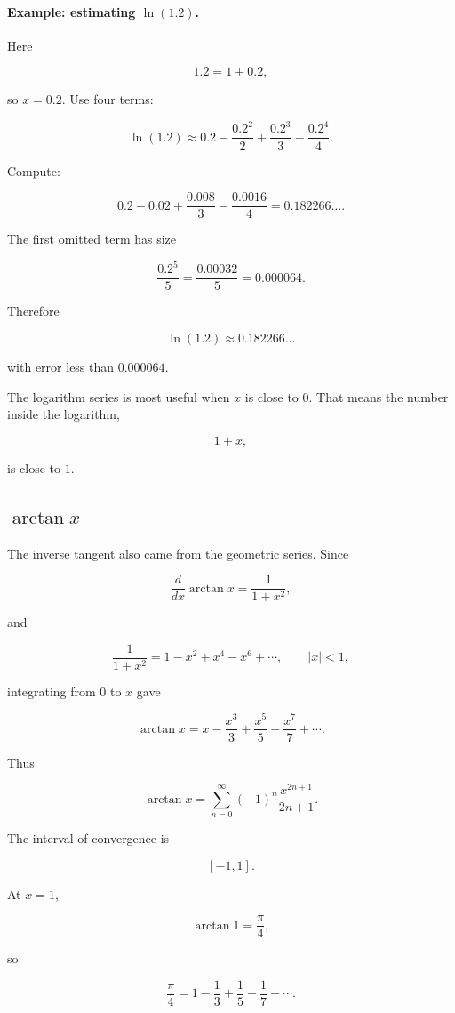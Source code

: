 \paragraph{Example: estimating \(\ln(1.2)\).}
Here

\[
1.2=1+0.2,
\]

so \(x=0.2\).  Use four terms:

\[
\ln(1.2)
\approx
0.2-\frac{0.2^2}{2}+\frac{0.2^3}{3}-\frac{0.2^4}{4}.
\]

Compute:

\[
0.2-0.02+\frac{0.008}{3}-\frac{0.0016}{4}
=
0.182266\ldots.
\]

The first omitted term has size

\[
\frac{0.2^5}{5}
=
\frac{0.00032}{5}
=
0.000064.
\]

Therefore

\[
\boxed{
\ln(1.2)\approx0.182266\ldots
}
\]

with error less than \(0.000064\).

The logarithm series is most useful when \(x\) is close to \(0\).  That means the number
inside the logarithm,

\[
1+x,
\]

is close to \(1\).

\subsection{\texorpdfstring{\(\arctan x\)}{arctan x}}
\label{subsec:taylor-series-arctan}

The inverse tangent also came from the geometric series.  Since

\[
\frac{d}{dx}\arctan x=\frac1{1+x^2},
\]

and

\[
\frac1{1+x^2}
=
1-x^2+x^4-x^6+\cdots,
\qquad |x|<1,
\]

integrating from \(0\) to \(x\) gave

\[
\arctan x
=
x-\frac{x^3}{3}+\frac{x^5}{5}-\frac{x^7}{7}+\cdots.
\]

Thus

\[
\boxed{
\arctan x=
\sum_{n=0}^{\infty}
(-1)^n\frac{x^{2n+1}}{2n+1}.
}
\]

The interval of convergence is

\[
\boxed{[-1,1].}
\]

At \(x=1\),

\[
\arctan 1=\frac{\pi}{4},
\]

so

\[
\boxed{
\frac{\pi}{4}
=
1-\frac13+\frac15-\frac17+\cdots.
}
\]

